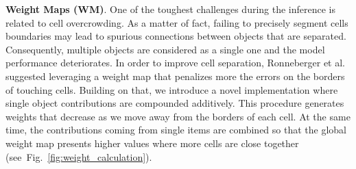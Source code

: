 \noindent\textbf{Weight Maps (WM)}. \label{sec:weights_map}
One of the toughest challenges during the inference is related to cell overcrowding. 
As a matter of fact, failing to precisely segment cells boundaries may lead to spurious connections between objects that are separated. Consequently, multiple objects are considered as a single one and the model performance deteriorates.
In order to improve cell separation, Ronneberger et al. \cite{unet} suggested leveraging a weight map that penalizes more the errors on the borders of touching cells.
Building on that, we introduce a novel implementation where single object contributions are compounded additively.
This procedure generates weights that decrease as we move away from the borders of each cell. 
At the same time, the contributions coming from single items are combined so that the global weight map presents higher values where more cells are close together (\mbox{see Fig. \ref{fig:weight_calculation}}).
